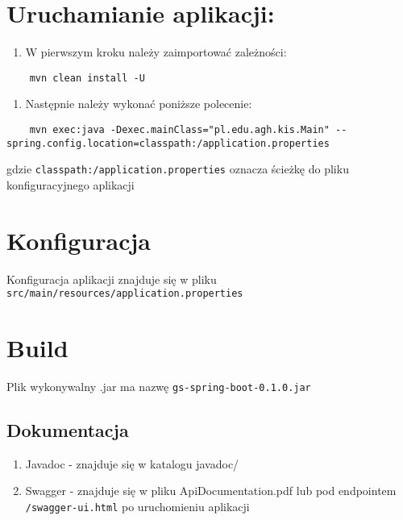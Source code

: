 \documentclass[]{article}
\providecommand{\tightlist}{%
  \setlength{\itemsep}{0pt}\setlength{\parskip}{0pt}}
\begin{document}
\hypertarget{uruchamianie-aplikacji}{%
\section{Uruchamianie aplikacji:}\label{uruchamianie-aplikacji}}

\begin{enumerate}
\def\labelenumi{\arabic{enumi}.}
\tightlist
\item
  W pierwszym kroku należy zaimportować zależności:
\end{enumerate}

\begin{verbatim}
    mvn clean install -U
\end{verbatim}

\begin{enumerate}
\def\labelenumi{\arabic{enumi}.}
\setcounter{enumi}{1}
\tightlist
\item
  Następnie należy wykonać poniższe polecenie:
\end{enumerate}

\begin{verbatim}
    mvn exec:java -Dexec.mainClass="pl.edu.agh.kis.Main" --spring.config.location=classpath:/application.properties 
\end{verbatim}

gdzie \texttt{classpath:/application.properties} oznacza ścieżkę do
pliku konfiguracyjnego aplikacji

\hypertarget{konfiguracja}{%
\section{Konfiguracja}\label{konfiguracja}}

Konfiguracja aplikacji znajduje się w pliku
\texttt{src/main/resources/application.properties}

\hypertarget{build}{%
\section{Build}\label{build}}

Plik wykonywalny .jar ma nazwę \texttt{gs-spring-boot-0.1.0.jar}

\hypertarget{dokumentacja}{%
\subsection{Dokumentacja}\label{dokumentacja}}

\begin{enumerate}
\def\labelenumi{\arabic{enumi}.}
\item
  Javadoc - znajduje się w katalogu javadoc/
\item
  Swagger - znajduje się w pliku ApiDocumentation.pdf lub pod endpointem
  \texttt{/swagger-ui.html} po uruchomieniu aplikacji
\end{enumerate}
\end{document}
